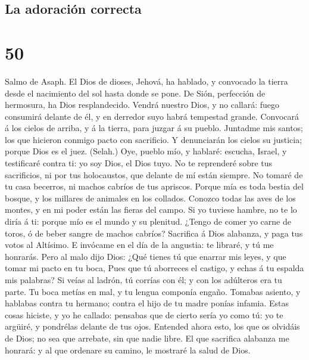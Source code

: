 \hypertarget{la-adoraciuxf3n-correcta}{%
\subsection{La adoración correcta}\label{la-adoraciuxf3n-correcta}}

\hypertarget{section-49}{%
\section{50}\label{section-49}}

 Salmo de Asaph. El Dios de dioses, Jehová, ha hablado, y
convocado la tierra desde el nacimiento del sol hasta donde se pone.
 De Sión, perfección de hermosura, ha Dios resplandecido.
 Vendrá nuestro Dios, y no callará: fuego consumirá
delante de él, y en derredor suyo habrá tempestad grande. 
Convocará á los cielos de arriba, y á la tierra, para juzgar á su
pueblo.  Juntadme mis santos; los que hicieron conmigo
pacto con sacrificio.  Y denunciarán los cielos su
justicia; porque Dios es el juez. (Selah.)  Oye, pueblo
mío, y hablaré: escucha, Israel, y testificaré contra ti: yo soy Dios,
el Dios tuyo.  No te reprenderé sobre tus sacrificios, ni
por tus holocaustos, que delante de mí están siempre.  No
tomaré de tu casa becerros, ni machos cabríos de tus apriscos.
 Porque mía es toda bestia del bosque, y los millares de
animales en los collados.  Conozco todas las aves de los
montes, y en mi poder están las fieras del campo.  Si yo
tuviese hambre, no te lo diría á ti: porque mío es el mundo y su
plenitud.  ¿Tengo de comer yo carne de toros, ó de beber
sangre de machos cabríos?  Sacrifica á Dios alabanza, y
paga tus votos al Altísimo.  E invócame en el día de la
angustia: te libraré, y tú me honrarás.  Pero al malo
dijo Dios: ¿Qué tienes tú que enarrar mis leyes, y que tomar mi pacto en
tu boca,  Pues que tú aborreces el castigo, y echas á tu
espalda mis palabras?  Si veías al ladrón, tú corrías con
él; y con los adúlteros era tu parte.  Tu boca metías en
mal, y tu lengua componía engaño.  Tomabas asiento, y
hablabas contra tu hermano; contra el hijo de tu madre ponías infamia.
 Estas cosas hiciste, y yo he callado: pensabas que de
cierto sería yo como tú: yo te argüiré, y pondrélas delante de tus ojos.
 Entended ahora esto, los que os olvidáis de Dios; no sea
que arrebate, sin que nadie libre.  El que sacrifica
alabanza me honrará: y al que ordenare su camino, le mostraré la salud
de Dios.

